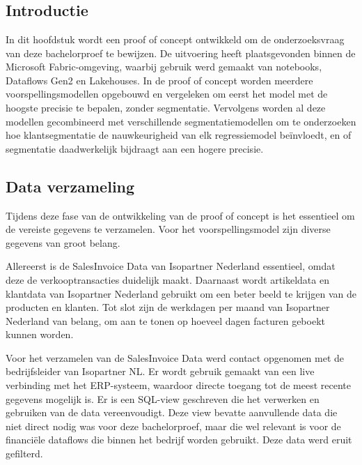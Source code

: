 
\chapter{}%
\label{ch:Proof of concept}


\section{Introductie}

In dit hoofdstuk wordt een proof of concept ontwikkeld om de onderzoeksvraag van deze bachelorproef te bewijzen. De uitvoering heeft plaatsgevonden binnen de Microsoft Fabric-omgeving, waarbij gebruik werd gemaakt van notebooks, Dataflows Gen2 en Lakehouses. In de proof of concept worden meerdere voorspellingsmodellen opgebouwd en vergeleken om eerst het model met de hoogste precisie te bepalen, zonder segmentatie. Vervolgens worden al deze modellen gecombineerd met verschillende segmentatiemodellen om te onderzoeken hoe klantsegmentatie de nauwkeurigheid van elk regressiemodel beïnvloedt, en of segmentatie daadwerkelijk bijdraagt aan een hogere precisie.

\newpage	

\section{Data verzameling}


Tijdens deze fase van de ontwikkeling van de proof of concept is het essentieel om de vereiste gegevens te verzamelen. Voor het voorspellingsmodel zijn diverse gegevens van groot belang. 

\vspace{1 em}

Allereerst is de SalesInvoice Data van Isopartner Nederland essentieel, omdat deze de verkooptransacties duidelijk maakt. Daarnaast wordt artikeldata en klantdata van Isopartner Nederland gebruikt om een beter beeld te krijgen van de producten en klanten. Tot slot zijn de werkdagen per maand van Isopartner Nederland van belang, om aan te tonen op hoeveel dagen facturen geboekt kunnen worden.

\vspace{1 em}

Voor het verzamelen van de SalesInvoice Data werd contact opgenomen met de bedrijfsleider van Isopartner NL. Er wordt gebruik gemaakt van een live verbinding met het ERP-systeem, waardoor directe toegang tot de meest recente gegevens mogelijk is. Er is een SQL-view geschreven die het verwerken en gebruiken van de data vereenvoudigt. Deze view bevatte aanvullende data die niet direct nodig was voor deze bachelorproef, maar die wel relevant is voor de financiële dataflows die binnen het bedrijf worden gebruikt. Deze data werd eruit gefilterd.

